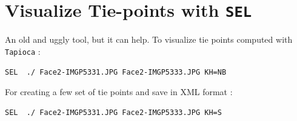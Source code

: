 
\section{Visualize Tie-points with {\tt SEL}}

An old and uggly tool, but it can help. To visualize tie points computed with
{\tt Tapioca} :

\begin{verbatim}
SEL  ./ Face2-IMGP5331.JPG Face2-IMGP5333.JPG KH=NB
\end{verbatim}

For creating a few set of tie points and save in XML format :

\begin{verbatim}
SEL  ./ Face2-IMGP5331.JPG Face2-IMGP5333.JPG KH=S
\end{verbatim}



